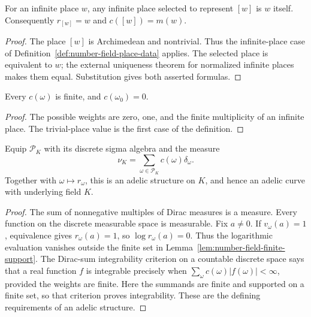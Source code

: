 \begin{lemma}\label{lem:number-field-infinite-normalization}
\leanok
{}
For an infinite place $w$, any infinite place selected to represent $[w]$
is $w$ itself. Consequently $r_{[w]}=w$ and $c([w])=m(w)$.
\end{lemma}
\begin{proof}
The place $[w]$ is Archimedean and nontrivial. Thus the infinite-place
case of Definition~\ref{def:number-field-place-data} applies. The selected
place is equivalent to $w$; the external uniqueness theorem for normalized
infinite places makes them equal. Substitution gives both asserted formulas.
\end{proof}

\begin{lemma}\label{lem:number-field-weights}
\leanok
{}
Every $c(\omega)$ is finite, and $c(\omega_0)=0$.
\end{lemma}
\begin{proof}
The possible weights are zero, one, and the finite multiplicity of an
infinite place. The trivial-place value is the first case of the definition.
\end{proof}

\begin{definition}\label{def:number-field-adelic-structure}
\leanok
{}
Equip $\mathcal P_K$ with its discrete sigma algebra and the measure
\[
 \nu_K=\sum_{\omega\in\mathcal P_K}c(\omega)\delta_\omega.
\]
Together with $\omega\mapsto r_\omega$, this is an adelic structure on
$K$, and hence an adelic curve with underlying field $K$.
\end{definition}
\begin{proof}
The sum of nonnegative multiples of Dirac measures is a measure. Every
function on the discrete measurable space is measurable. Fix $a\ne0$.
If $v_\omega(a)=1$, equivalence gives $r_\omega(a)=1$, so
$\log r_\omega(a)=0$. Thus the logarithmic evaluation vanishes outside
the finite set in Lemma~\ref{lem:number-field-finite-support}.
The Dirac-sum integrability criterion on a countable discrete space says
that a real function $f$ is integrable precisely when
$\sum_\omega c(\omega)|f(\omega)|<\infty$, provided the weights are
finite. Here the summands are finite and supported on a finite set, so
that criterion proves integrability. These are the defining requirements
of an adelic structure.
\end{proof}

